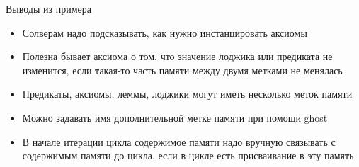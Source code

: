 \documentclass[hyperref={unicode=true}]{beamer}
\begin{document}
    \begin{frame}{Выводы из примера}
    \begin{itemize}
    \item Солверам надо подсказывать, как нужно инстанцировать аксиомы
    \item Полезна бывает аксиома о том, что значение лоджика или предиката не
    изменится, если такая-то часть памяти между двумя метками не менялась
    \item Предикаты, аксиомы, леммы, лоджики могут иметь несколько меток памяти
    \item Можно задавать имя дополнительной метке памяти при помощи ghost
    \item В начале итерации цикла содержимое памяти надо вручную связывать с
    содержимым памяти до цикла, если в цикле есть присваивание в эту память
    \end{itemize}
    \end{frame}
\end{document}
